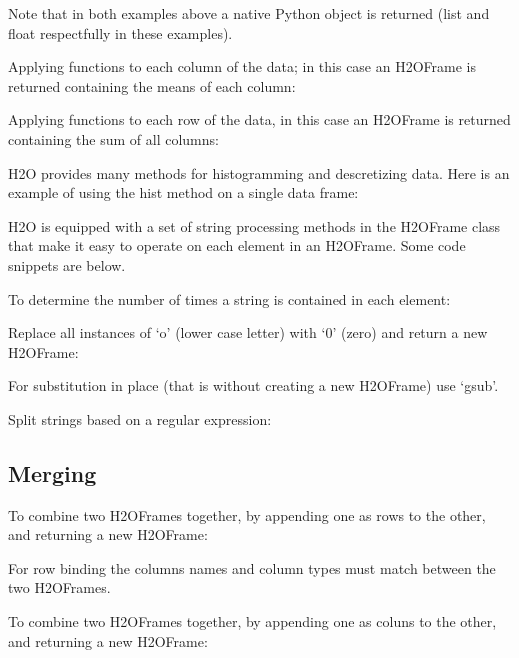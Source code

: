 Note that in both examples above a native Python object is returned (list and float respectfully
in these examples).

Applying functions to each column of the data;
in this case an H2OFrame is returned containing the means of each column:


Applying functions to each row of the data,
in this case an H2OFrame is returned containing the sum of all columns:


H2O provides many methods for histogramming and descretizing data.
Here is an example of using the hist method on a single data frame:


H2O is equipped with a set of string processing methods in the H2OFrame class
that make it easy to operate on each element in an H2OFrame.  Some code snippets are below.

To determine the number of times a string is contained in each element:


Replace all instances of `o' (lower case letter) with `0' (zero) and return a new H2OFrame:


For substitution in place (that is without creating a new H2OFrame) use `gsub'.

Split strings based on a regular expression:



\subsection{Merging}
To combine two H2OFrames together, by appending one as rows to the other, and returning a new H2OFrame:


For row binding the columns names and column types must match between the two H2OFrames.

To combine two H2OFrames together, by appending one as coluns to the other,
and returning a new H2OFrame:


